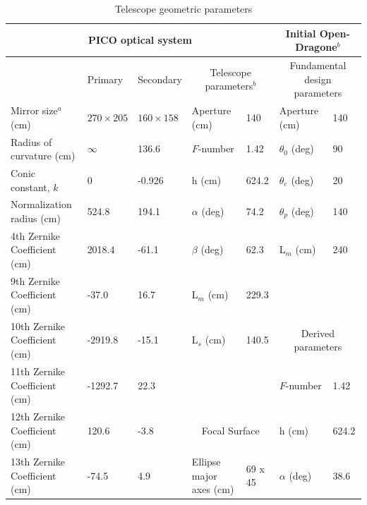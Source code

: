 \documentclass[]{spie}  %
\begin{document}
\begin{table}[ht]
\centering
\caption{Telescope geometric parameters  \label{tab:optics}}

\begin{adjustbox}{width=1.05\textwidth}
\hspace{-1cm}
\begin{tabular}{|l|llll||ll|}
\hline
\multicolumn{5}{|c||}{PICO optical system}                                    & \multicolumn{2}{c|}{Initial Open-Dragone$^b$}     \\ \hline
                          & Primary           & Secondary    & \multicolumn{2}{c||}{Telescope parameters$^b$} & \multicolumn{2}{c|}{Fundamental design parameters}  \\
Mirror size$^a$ (cm)      & $270 \times 205$ & $160 \times 158$ & Aperture (cm)           & 140      & Aperture (cm)                  & 140   \\
Radius of curvature (cm)  & $\infty$         & 136.6             & $F$-number             & 1.42     & $\theta_0$ (deg)           & 90    \\
Conic constant, $k$       & 0                 & -0.926            & h (cm)                    & 624.2    & $\theta_e$ (deg)           & 20    \\
Normalization radius (cm) & 524.8             & 194.1             & $\alpha$ (deg)            & 74.2     & $\theta_p$ (deg)           & 140   \\
4th Zernike Coefficient (cm)  & 2018.4            & -61.1             & $\beta$  (deg)            &  62.3    & L$_m$ (cm)                     & 240   \\
9th Zernike Coefficient (cm)  & -37.0             & 16.7              & L$_m$ (cm)                &   229.3  &                                &         \\
10th Zernike Coefficient (cm) & -2919.8           & -15.1             & L$_s$ (cm)                &   140.5  & \multicolumn{2}{c|}{Derived parameters} \\ 
11th Zernike Coefficient (cm) & -1292.7           & 22.3              &                           &          & $F$-number                     & 1.42  \\   
12th Zernike Coefficient (cm) & 120.6             & -3.8             &   \multicolumn{2}{c||}{Focal Surface}  & h (cm)                         & 624.2 \\   
13th Zernike Coefficient (cm) & -74.5             & 4.9               & Ellipse major axes (cm)   & 69 x 45  & $\alpha$ (deg)                 & 38.6  \\   

\end{tabular}
\end{adjustbox}
\end{table}
\end{document}
